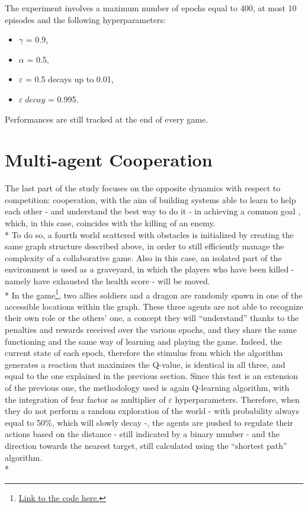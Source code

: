 The experiment involves a maximum number of epochs equal to 400,
at most 10 episodes and the following hyperparameters:
\begin{itemize}[noitemsep, topsep=0ex]
  \item $\gamma$ = 0.9,
  \item $\alpha$ = 0.5,
  \item $\varepsilon$ = 0.5 decays up to 0.01,
  \item $\varepsilon\;decay$ = 0.995.
\end{itemize}
Performances are still tracked at the end of every game.

\section{Multi-agent Cooperation}
The last part of the study focuses on the opposite dynamics with respect to competition: cooperation, with the aim of building systems able to learn to help each other - and understand the best way to do it - in achieving a common goal , which, in this case, coincides with the killing of an enemy.\\*
To do so, a fourth world scattered with obstacles is initialized by creating the same graph structure described above, in order to still efficiently manage the complexity of a collaborative game. Also in this case, an isolated part of the environment is used as a graveyard, in which the players who have been killed - namely have exhausted the health score - will be moved.\\*
In the game\footnote{\href{https://github.com/moiraghif/DragonHunting/tree/master/TeamWork}{Link to the code here.}}, two allies soldiers and a dragon are randomly spawn in one of the accessible locations within the graph. These three agents are not able to recognize their own role or the others' one, a concept they will ``understand'' thanks to the penalties and rewards received over the various epochs, and they share the same functioning and the same way of learning and playing the game. Indeed, the current state of each epoch, therefore the stimulus from which the algorithm generates a reaction that maximizes the Q-value, is identical in all three, and equal to the one explained in the previous section. Since this test is an extension of the previous one, the methodology used is again Q-learning algorithm, with the integration of fear factor as multiplier of $\varepsilon$ hyperparameters. Therefore, when they do not perform a random exploration of the world - with probability always equal to 50\%, which will slowly decay -, the agents are pushed to regulate their actions based on the distance - still indicated by a binary number - and the direction towards the nearest target, still calculated using the ``shortest path'' algorithm.\\*
